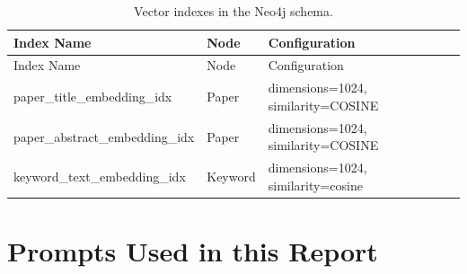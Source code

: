 \documentclass{llmxive}
\begin{document}
{
\begin{longtable}{@{}p{5.5cm}p{1.5cm}p{4.8cm}@{}}
\caption{Vector indexes in the Neo4j schema.}
\label{tab:indexes-vector} \\

\toprule
{ Index Name\par} & Node & { Configuration\par} \\
\midrule
\endfirsthead

\toprule
{ Index Name\par} & Node & { Configuration\par} \\
\midrule
\endhead

\bottomrule
\endfoot

{ paper\_\allowbreak title\_\allowbreak embedding\_\allowbreak idx\par} & Paper &
{ dimensions=1024, similarity=COSINE\par} \\

{ paper\_\allowbreak abstract\_\allowbreak embedding\_\allowbreak idx\par} & Paper &
{ dimensions=1024, similarity=COSINE\par} \\

{ keyword\_\allowbreak text\_\allowbreak embedding\_\allowbreak idx\par} & Keyword &
{ dimensions=1024, similarity=cosine\par} \\

\end{longtable}
}

\section{Prompts Used in this Report}
\end{document}
